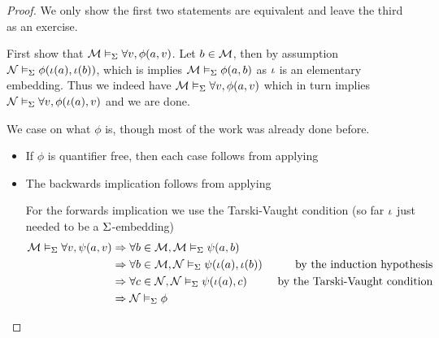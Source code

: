 \begin{proof}
    We only show the first two statements are equivalent and
    leave the third as an exercise.
    \begin{forward}
        First show that $\mathcal{M} \vDash_{\Sigma} \forall v, \phi(a,v)$.
        Let $b \in {\mathcal{M}}$, 
        then by assumption $\mathcal{N} \vDash_{\Sigma} \phi(\iota(a),\iota(b))$,
        which is implies $\mathcal{M} \vDash_{\Sigma} \phi(a,b)$
        as $\iota$ is an elementary embedding.
        Thus we indeed have $\mathcal{M} \vDash_{\Sigma} \forall v, \phi(a,v)$
        which in turn implies $\mathcal{N} \vDash_{\Sigma} \forall v, \phi(\iota(a),v)$
        and we are done.
    \end{forward}

    \begin{backward}
        We case on what $\phi$ is, 
        though most of the work was already done before.
        \begin{itemize}
            \item If $\phi$ is quantifier free, 
            then each case follows from applying

            \item The backwards implication follows from applying 

                For the forwards implication 
                we use the Tarski-Vaught condition
                (so far $\iota$ just needed to be a $\Sigma$-embedding)
\begin{align*}
    \mathcal{M} \vDash_{\Sigma} \forall v, \psi (a,v) &
        \Rightarrow \forall b \in {\mathcal{M}}, \mathcal{M} \vDash_{\Sigma} \psi(a,b)\\
        &\Rightarrow \forall b \in {\mathcal{M}}, 
            \mathcal{N} \vDash_{\Sigma} \psi(\iota(a),\iota(b))
            & \text{ by the induction hypothesis}\\
        &\Rightarrow \forall c \in {\mathcal{N}}, \mathcal{N} \vDash_{\Sigma} \psi(\iota(a),c)
            & \text{ by the Tarski-Vaught condition}\\
        &\Rightarrow \mathcal{N} \vDash_{\Sigma} \phi
\end{align*}
        \end{itemize}
    \end{backward}
\end{proof}

